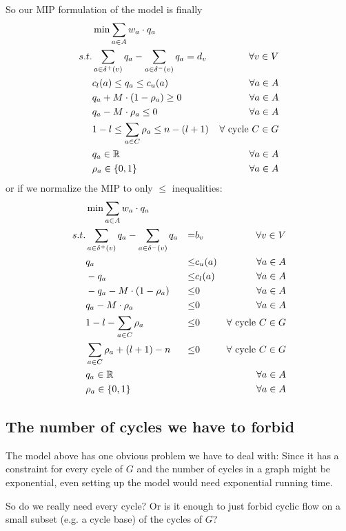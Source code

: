 So our MIP formulation of the model is finally
\begin{align*}
 &\min \sum_{a\in A} w_a\cdot q_a & \\
 s.t. & \sum_{a\in \delta^+(v)}q_a - \sum_{a\in\delta^- (v)}q_a = d_v\ &\forall v\in V \\
  & c_l(a)\le q_a \le c_u(a) & \forall a\in A\\
 &q_a + M\cdot (1-\rho_a) \ge 0 & \forall a\in A\\
 &q_a - M\cdot \rho_a \le 0 & \forall a\in A\\
 &1-l \le \sum_{a\in C}\rho_a \le n-(l+1) & \forall \textrm{ cycle }C\in G\\
 & q_a \in \mathbb{R} &\forall a\in A\\
 & \rho_a \in \{0,1\} &\forall a\in A
\end{align*}
or if we normalize the MIP to only $\le$ inequalities:
\begin{align}
 &\min \sum_{a\in A} w_a\cdot q_a & \\
 s.t. & \sum_{a\in \delta^+(v)}q_a - \sum_{a\in\delta^- (v)}q_a &=& b_v\ &\forall v\in V \\
 & q_a &\le& c_u(a) & \forall a\in A\\
 & -q_a &\le& c_l(a) & \forall a\in A\\
 &-q_a - M\cdot (1-\rho_a) &\le& 0 & \forall a\in A\\
 &q_a - M\cdot \rho_a &\le& 0 & \forall a\in A\\
 &1-l - \sum_{a\in C}\rho_a &\le& 0 & \forall \textrm{ cycle }C\in G\\
 & \sum_{a\in C}\rho_a +(l+1)-n &\le& 0 & \forall \textrm{ cycle }C\in G\\
 & q_a \in \mathbb{R} & & &\forall a\in A\\
 & \rho_a \in \{0,1\} & & &\forall a\in A
\end{align}


\subsection{The number of cycles we have to forbid}
The model above has one obvious problem we have to deal with: Since it has a constraint for every cycle of $G$ and the 
number of cycles in a graph might be exponential, even setting up the model would need exponential running time. 

So do we really need every cycle? Or is it enough to just forbid cyclic flow on a small subset (e.g. a cycle base) of 
the cycles of $G$? 

